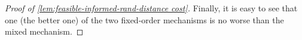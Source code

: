 \begin{proof}[Proof of \cref{lem:feasible-informed-rand-distance cost}]
    Finally, it is easy to see that one (the better one) of the two fixed-order mechanisms is no worse than the mixed mechanism.
    






\end{proof}

